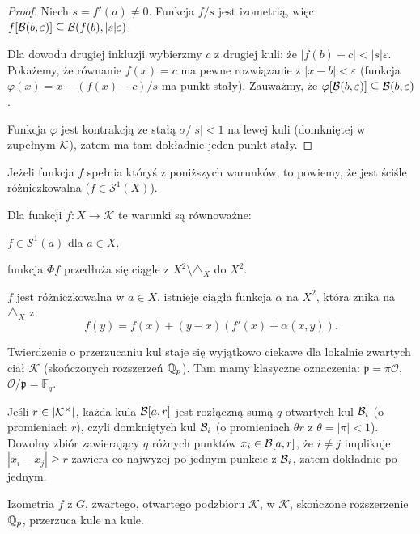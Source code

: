 \begin{proof}
	Niech $s = f'(a) \neq 0$.
	Funkcja $f / s$ jest izometrią, więc $f[\mathcal B(b, \varepsilon)] \subseteq \mathcal B(f(b), |s| \varepsilon)$.

	Dla dowodu drugiej inkluzji wybierzmy $c$ z drugiej kuli: że $|f(b) - c| < |s| \varepsilon$.
	Pokażemy, że równanie $f(x) = c$ ma pewne rozwiązanie z $|x - b| < \varepsilon$ (funkcja $\varphi(x) = x - (f(x) - c) / s$ ma punkt stały).
	Zauważmy, że $\varphi[\mathcal B(b, \varepsilon)] \subseteq \mathcal B(b, \varepsilon)$.

	Funkcja $\varphi$ jest kontrakcją ze stałą $\sigma/|s| < 1$ na lewej kuli (domkniętej w zupełnym $\mathcal K$), zatem ma tam dokładnie jeden punkt stały.
\end{proof}

Jeżeli funkcja $f$ spełnia któryś z poniższych warunków, to powiemy, że jest {ściśle różniczkowalna} ($f \in \mathcal S^1(X)$).

\begin{fakt}
	Dla funkcji $f \colon X \to \mathcal K$ te warunki są równoważne:
	\begin{enumx}
		\item $f \in \mathcal S^1(a)$ dla $a \in X$.
		\item funkcja $\Phi f$ przedłuża się ciągle z $X^2 \setminus \triangle_X$ do $X^2$.
		\item $f$ jest różniczkowalna w $a \in X$, istnieje ciągła funkcja $\alpha$ na $X^2$, która znika na $\triangle_X$ z
		\[
			f(y) = f(x) + (y-x) (f'(x) + \alpha(x,y)).
		\]
	\end{enumx}
\end{fakt}

Twierdzenie o przerzucaniu kul staje się wyjątkowo ciekawe dla lokalnie zwartych ciał $\mathcal K$ (skończonych rozszerzeń $\mathbb Q_p$).
Tam mamy klasyczne oznaczenia: $\mathfrak p = \pi \mathcal O$, $\mathcal O/\mathfrak p = \mathbb F_q$.

Jeśli $r \in |\mathcal K^\times|$, każda kula $\mathcal B[a, r]$ jest rozłączną sumą $q$ otwartych kul $\mathcal B_i$ (o promieniach $r$), czyli domkniętych kul $\mathcal B_i$ (o promieniach $\theta r$ z $\theta = |\pi| < 1$).
Dowolny zbiór zawierający $q$ różnych punktów $x_i \in \mathcal B[a, r]$, że $i \neq j$ implikuje $|x_i - x_j| \ge r$ zawiera co najwyżej po jednym punkcie z $\mathcal B_i$, zatem dokładnie po jednym.

\begin{fakt} \label{exinferius}
	Izometria $f$ z $G$, zwartego, otwartego podzbioru $\mathcal K$, w $\mathcal K$, skończone rozszerzenie $\mathbb Q_p$, przerzuca kule na kule.
\end{fakt}

